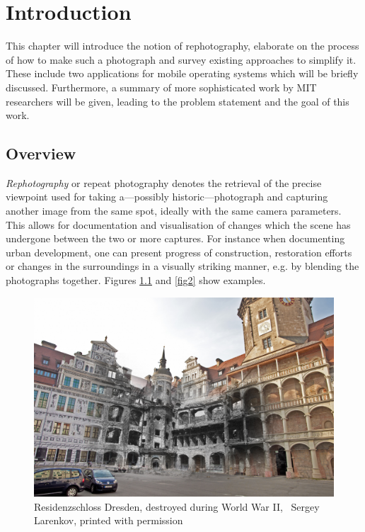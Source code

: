 \chapter{Introduction}

This chapter will introduce the notion of rephotography, elaborate on the
process of how to make such a photograph and survey existing approaches to
simplify it. These include two applications for mobile operating systems which
will be briefly discussed. Furthermore, a summary of more sophisticated work by
MIT researchers will be given, leading to the problem statement and the goal of
this work.

\section{Overview}

\emph{Rephotography} or repeat photography denotes the retrieval of the precise
viewpoint used for taking a---possibly historic---photograph and capturing
another image from the same spot, ideally with the same camera parameters. This
allows for documentation and visualisation of changes which the scene has
undergone between the two or more captures.  For instance when documenting urban
development, one can present progress of construction, restoration efforts or
changes in the surroundings in a visually striking manner, e.g. by blending the
photographs together.  Figures \ref{fig1} and \ref{fig2} show examples.

\begin{figure}
   \includegraphics[width=\textwidth]{gfx/1945_2014_Residenzschloss_small.jpg}
   \caption[Residenzschloss Dresden]{Residenzschloss Dresden, destroyed during World War II,
   \textcopyright\ Sergey Larenkov, printed with permission}
   \label{fig1}
\end{figure}


